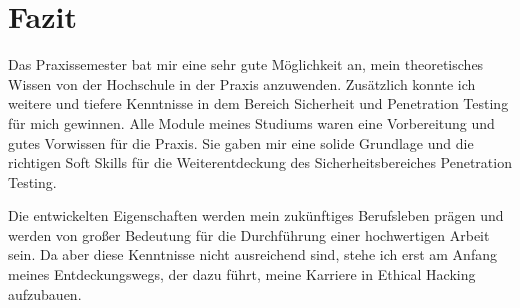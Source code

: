 \section{Fazit}

Das Praxissemester bat mir eine sehr gute Möglichkeit an, mein theoretisches Wissen von der Hochschule in der Praxis anzuwenden. Zusätzlich konnte ich weitere und tiefere Kenntnisse in dem Bereich Sicherheit und Penetration Testing für mich gewinnen. Alle Module meines Studiums waren eine Vorbereitung und gutes Vorwissen für die Praxis. Sie gaben mir eine solide Grundlage und die richtigen Soft Skills für die Weiterentdeckung des Sicherheitsbereiches Penetration Testing. 

Die entwickelten Eigenschaften werden mein zukünftiges Berufsleben prägen und werden von großer Bedeutung für die Durchführung einer hochwertigen Arbeit sein. Da aber diese Kenntnisse nicht ausreichend sind, stehe ich erst am Anfang meines Entdeckungswegs, der dazu führt, meine Karriere in Ethical Hacking aufzubauen.